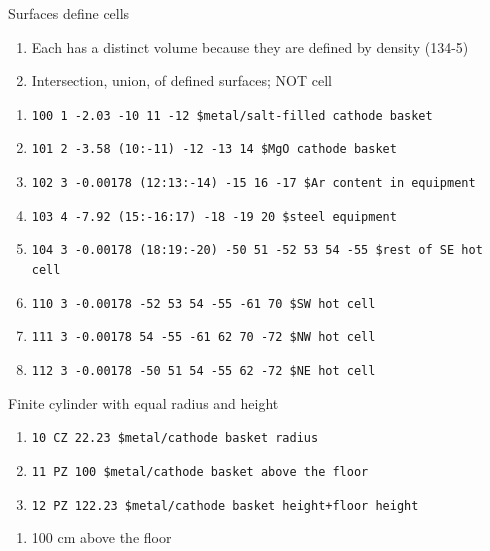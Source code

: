 \documentclass[aspectratio=1610,pdftex,dvipsnames,compress,xcolor={dvipsnames}]{beamer}
\begin{document}
\addtocounter{framenumber}{-1} 
\begin{frame}{Surfaces define cells}
    \begin{enumerate}[series=outerlist,topsep=0pt,itemsep=21pt,leftmargin=*,label=(\arabic*)]
        \item[]Each has a distinct volume because they are defined by density (134-5)
        \item[]Intersection, union, of defined surfaces; NOT cell
    \end{enumerate}
    \small
    \begin{enumerate}[series=outerlist,topsep=7pt,itemsep=1pt,leftmargin=*,label=(\arabic*)]
        \item[]\texttt{100    1 -2.03                -10 11 -12                 \$metal/salt-filled cathode basket}
        \item[]\texttt{101    2 -3.58    (10:-11)    -12 -13 14                 \$MgO cathode basket}
        \item[]\texttt{102    3 -0.00178 (12:13:-14) -15 16 -17                 \$Ar content in equipment}
        \item[]\texttt{103    4 -7.92    (15:-16:17) -18 -19 20                 \$steel equipment}
        \item[]\texttt{104    3 -0.00178 (18:19:-20) -50 51 -52 53 54 -55       \$rest of SE hot cell}
        \item[]\texttt{110    3 -0.00178             -52 53 54 -55 -61 70       \$SW hot cell}
        \item[]\texttt{111    3 -0.00178              54 -55 -61 62 70 -72      \$NW hot cell}
        \item[]\texttt{112    3 -0.00178             -50 51 54 -55 62 -72       \$NE hot cell}
    \end{enumerate}
\end{frame}


\begin{frame}{Finite cylinder with equal radius and height}
    \small
    \begin{enumerate}[series=outerlist,topsep=0pt,itemsep=1pt,leftmargin=*,label=(\arabic*)]
        \item[]\texttt{10     CZ  22.23        \$metal/cathode basket radius}
        \item[]\texttt{11     PZ  100          \$metal/cathode basket above the floor}
        \item[]\texttt{12     PZ  122.23       \$metal/cathode basket height+floor height}
    \end{enumerate}
    \normalsize
    \begin{enumerate}[series=outerlist,topsep=21pt,itemsep=21pt,leftmargin=*,label=(\arabic*)]
        \item[]100 cm above the floor
    \end{enumerate}
\end{frame}
\end{document}
